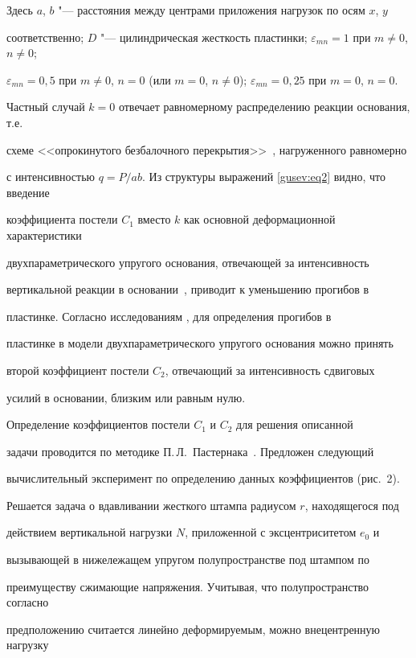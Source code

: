 Здесь $a$, $b$ "--- расстояния между центрами приложения нагрузок по осям $x$, $y$

соответственно; $D$ "--- цилиндрическая жесткость пластинки; $\varepsilon_{mn}=1$ при $m \ne 0$, $n \ne 0$;

$\varepsilon_{mn}=0,5$ при $m\ne 0$, $n=0$ (или $m=0$, $n\ne 0$); $\varepsilon_{mn}=0,25$ при $m=0$, $n=0$.



Частный случай $k=0$ отвечает равномерному распределению реакции основания, т.е.

схеме <<опрокинутого безбалочного перекрытия>>~\cite{gusev:bib2}, нагруженного равномерно

с интенсивностью $q=P/ab$. Из структуры выражений \eqref{gusev:eq2} видно, что введение

коэффициента постели $C_1$ вместо $k$ как основной деформационной характеристики

двухпараметрического упругого основания, отвечающей за интенсивность

вертикальной реакции в основании~\cite{gusev:bib3}, приводит к уменьшению прогибов в

пластинке. Согласно исследованиям \cite{gusev:bib4,gusev:bib5}, для определения прогибов в

пластинке в модели двухпараметрического упругого основания можно принять

второй коэффициент постели $C_2$, отвечающий за интенсивность сдвиговых

усилий в основании, близким или равным нулю.



Определение коэффициентов постели $C_1$ и $C_2$ для решения описанной

задачи проводится по методике П.\,Л.~Пастернака~\cite{gusev:bib3}. Предложен следующий

вычислительный эксперимент по определению данных коэффициентов (рис.~2).

Решается задача о вдавливании жесткого штампа радиусом $r$, находящегося под

действием вертикальной нагрузки $N$, приложенной с эксцентриситетом $e_0$ и

вызывающей в нижележащем упругом полупространстве под штампом по

преимуществу сжимающие напряжения. Учитывая, что полупространство согласно

предположению считается линейно деформируемым, можно внецентренную нагрузку

